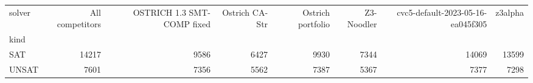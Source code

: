 \begin{tabular}{lrrrrrrr}
\toprule
solver & All competitors & OSTRICH 1.3 SMT-COMP fixed & Ostrich CA-Str & Ostrich portfolio & Z3-Noodler & cvc5-default-2023-05-16-ea045f305 & z3alpha \\
kind &  &  &  &  &  &  &  \\
\midrule
SAT & 14217 & 9586 & 6427 & 9930 & 7344 & 14069 & 13599 \\
UNSAT & 7601 & 7356 & 5562 & 7387 & 5367 & 7377 & 7298 \\
\bottomrule
\end{tabular}
